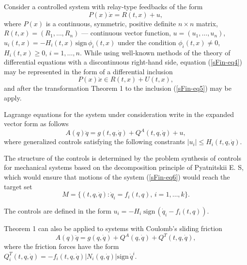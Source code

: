 \documentclass[12pt]{llncs}
\begin{document}
Consider a controlled system with relay-type feedbacks of the form
\begin{equation}
	\label{sFin-eq4}
	P(x)\dot{x}=R(t,x)+u,
\end{equation}
where $P(x)$ is a continuous, symmetric, positive definite $n\times n$ matrix, $R(t,x)=(R_{1},\ldots,R_{n})$
--- continuous vector function, $u=(u_{1},\ldots,u_{n})$, $u_{i}(t,x)=-H_{i}(t,x)\,
\mbox{sign}\,\phi_{i}(t,x)$ under the condition $\phi_{i}(t,x)\neq 0$, ${H_{i}(t,x)\geq 0 }$, $i=1,\ldots,n$. While using well-known methods of the theory of differential equations with a discontinuous right-hand side, equation
(\ref{sFin-eq4})
may be represented in the form of a differential inclusion
\begin{equation}
	\label{sFin-eq5}
	P(x)\dot{x}\in R(t,x)+U(t,x),
\end{equation}
and after the transformation  Theorem 1 to the inclusion 
(\ref{sFin-eq5}) 
may be apply. 





Lagrange equations for the system under consideration write in the expanded vector
form as follows
\begin{equation}
	\label{sFin-eq6}
	A(q)\ddot{q} = g(t,q,\dot{q}) + Q^{A}(t,q,\dot{q}) + u,
\end{equation}
where
generalized controls satisfying the following constrants
$|u_{i}|\leq H_{i}(t,q,\dot{q})$. 

The structure of the controls is determined by the problem synthesis of controls for mechanical systems based on the decomposition principle of Pyatnitskii E. S,  
which 
would ensure that motions of the system 
(\ref{sFin-eq6})
would reach the target set 
$$
M=\{(t,q,\dot{q}): \dot{q}_{i}=f_{i}(t,q),\,i=1,\ldots,k\}.
$$

The controls are defined in the form  $u_{i}=-H_{i}\;\mbox{sign}\,(\dot{q}_{i}-f_{i}(t,q))$.



Theorem 1 can also be applied to systems with Coulomb's sliding friction
$$
	A(q)\ddot{q}=g(q,\dot{q})+ Q^{A}(q,\dot{q})+Q^{T}(t,q,\dot{q }), 
$$
where the friction forces have the form $Q_{i}^{T}(t,q,\dot{q})= -f_{i}(t,q,\dot{q})|N_{i}(q,\dot{q}) | \mbox{sign}\,\dot{q}^{i}
$.





%
\end{document}
